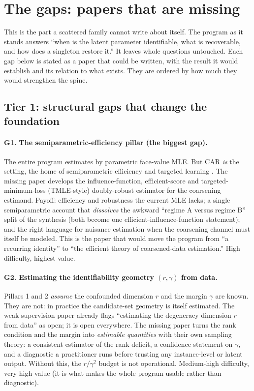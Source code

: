 \documentclass[11pt]{article}
\begin{document}
\section{The gaps: papers that are missing}

This is the part a scattered family cannot write about itself. The program as it
stands answers ``when is the latent parameter identifiable, what is recoverable, and
how does a singleton restore it.'' It leaves whole questions untouched. Each gap
below is stated as a paper that could be written, with the result it would establish
and its relation to what exists. They are ordered by how much they would strengthen
the spine.

\subsection{Tier 1: structural gaps that change the foundation}

\paragraph{G1. The semiparametric-efficiency pillar (the biggest gap).}
The entire program estimates by parametric face-value MLE. But CAR \emph{is} the
\citet{gill1997coarsening} setting, the home of semiparametric efficiency
\citep{tsiatis2006semiparametric} and targeted learning \citep{vanderlaan2011targeted}.
The missing paper develops the influence-function, efficient-score
and targeted-minimum-loss (TMLE-style) doubly-robust estimator for the coarsening
estimand. Payoff: efficiency and robustness the current MLE lacks; a single
semiparametric account that \emph{dissolves} the awkward ``regime A versus regime
B'' split of the synthesis (both become one efficient-influence-function statement);
and the right language for nuisance estimation when the coarsening channel must
itself be modeled. This is the paper that would move the program from ``a recurring
identity'' to ``the efficient theory of coarsened-data estimation.'' High
difficulty, highest value.

\paragraph{G2. Estimating the identifiability geometry $(r,\gamma)$ from data.}
Pillars 1 and 2 \emph{assume} the confounded dimension $r$ and the margin $\gamma$
are known. They are not: in practice the candidate-set geometry is itself estimated.
The weak-supervision paper already flags ``estimating the degeneracy dimension $r$
from data'' as open; it is open everywhere. The missing paper turns the rank
condition and the margin into \emph{estimable quantities} with their own sampling
theory: a consistent estimator of the rank deficit, a confidence statement on
$\gamma$, and a diagnostic a practitioner runs before trusting any instance-level or
latent output. Without this, the $r/\gamma^2$ budget is not operational. Medium-high
difficulty, very high value (it is what makes the whole program usable rather than
diagnostic).
\end{document}
